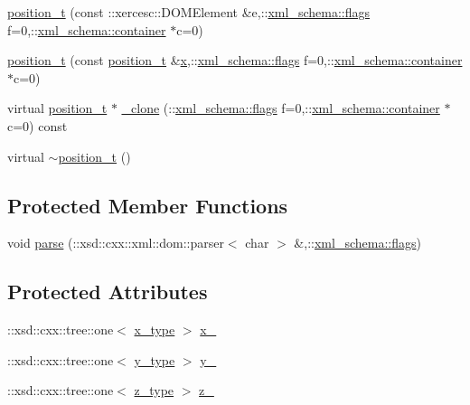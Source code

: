 \begin{DoxyCompactItemize}
\item 
\hyperlink{classposition__t_a3ca2cfedb786d6549dcc17d75ee5a8b7}{position\-\_\-t} (const \-::xercesc\-::\-D\-O\-M\-Element \&e,\-::\hyperlink{namespacexml__schema_a0612287d030cb2732d31a45b258fdc87}{xml\-\_\-schema\-::flags} f=0,\-::\hyperlink{namespacexml__schema_ada9aa30dc722e93ee2ed7243085402a5}{xml\-\_\-schema\-::container} $\ast$c=0)
\item 
\hyperlink{classposition__t_a5091933185d72e4570b86f415ff162aa}{position\-\_\-t} (const \hyperlink{classposition__t}{position\-\_\-t} \&\hyperlink{classposition__t_a3234862041a420b148df2993ed9c75b1}{x},\-::\hyperlink{namespacexml__schema_a0612287d030cb2732d31a45b258fdc87}{xml\-\_\-schema\-::flags} f=0,\-::\hyperlink{namespacexml__schema_ada9aa30dc722e93ee2ed7243085402a5}{xml\-\_\-schema\-::container} $\ast$c=0)
\item 
virtual \hyperlink{classposition__t}{position\-\_\-t} $\ast$ \hyperlink{classposition__t_adb0ccfcaf18fb57f380cc1bdbd353a82}{\-\_\-clone} (\-::\hyperlink{namespacexml__schema_a0612287d030cb2732d31a45b258fdc87}{xml\-\_\-schema\-::flags} f=0,\-::\hyperlink{namespacexml__schema_ada9aa30dc722e93ee2ed7243085402a5}{xml\-\_\-schema\-::container} $\ast$c=0) const 
\item 
virtual \hyperlink{classposition__t_a01bc521c744140617a4ee656af3e4d3a}{$\sim$position\-\_\-t} ()
\end{DoxyCompactItemize}
\subsection*{Protected Member Functions}
\begin{DoxyCompactItemize}
\item 
void \hyperlink{classposition__t_a64e519162990fff9d30d7d54c0ec48da}{parse} (\-::xsd\-::cxx\-::xml\-::dom\-::parser$<$ char $>$ \&,\-::\hyperlink{namespacexml__schema_a0612287d030cb2732d31a45b258fdc87}{xml\-\_\-schema\-::flags})
\end{DoxyCompactItemize}
\subsection*{Protected Attributes}
\begin{DoxyCompactItemize}
\item 
\-::xsd\-::cxx\-::tree\-::one$<$ \hyperlink{classposition__t_a591a4bfd8546a40bc8dfca674cb54719}{x\-\_\-type} $>$ \hyperlink{classposition__t_a60250d37007dbfaa7fa16ab2c1917db7}{x\-\_\-}
\item 
\-::xsd\-::cxx\-::tree\-::one$<$ \hyperlink{classposition__t_afe9eaece61abab81f8ead82576de6175}{y\-\_\-type} $>$ \hyperlink{classposition__t_aa907630b4c4487935e5f4f3a10835300}{y\-\_\-}
\item 
\-::xsd\-::cxx\-::tree\-::one$<$ \hyperlink{classposition__t_ab6171c246c19584481804a5e2da8561f}{z\-\_\-type} $>$ \hyperlink{classposition__t_af239aae25aff69d6f8934a737d4e4152}{z\-\_\-}
\end{DoxyCompactItemize}


